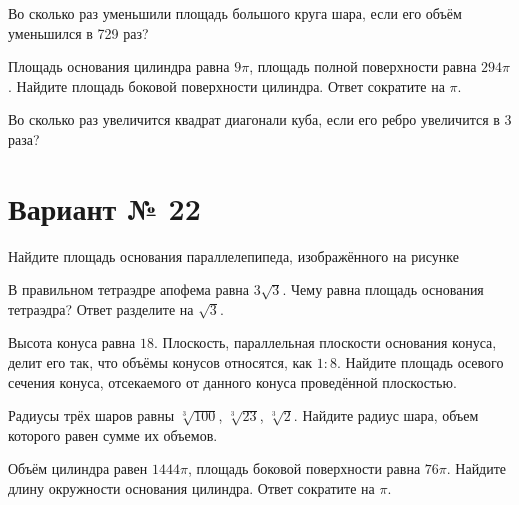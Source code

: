 \documentclass[4apaper]{article}
\begin{document}
\begin{taskBN}{4}
Во сколько раз уменьшили площадь большого круга шара, если его объём уменьшился в 729 раз?
\end{taskBN}

\begin{taskBN}{5}
Площадь основания цилиндра равна $9\pi$, площадь полной поверхности равна $294\pi$. Найдите площадь боковой поверхности цилиндра. Ответ сократите на $\pi$.
\end{taskBN}

\begin{taskBN}{6}
Во сколько раз увеличится квадрат диагонали куба, если его ребро увеличится в 3 раза?
\end{taskBN}
\newpage\section*{Вариант № 22}

\begin{taskBN}{1}
Найдите площадь основания параллелепипеда, изображённого на рисунке
\end{taskBN}

\begin{taskBN}{2}
В правильном тетраэдре апофема равна $3\sqrt{3}$. Чему равна площадь основания тетраэдра? Ответ разделите на $\sqrt{3}$.
\end{taskBN}

\begin{taskBN}{3}
Высота конуса равна $18$. Плоскость, параллельная плоскости основания конуса,  делит его так, что объёмы конусов относятся, как $1:8$. Найдите площадь осевого сечения конуса, отсекаемого от данного конуса проведённой плоскостью. 
\end{taskBN}

\begin{taskBN}{4}
Радиусы трёх шаров равны $\sqrt[3]{100}$, $\sqrt[3]{23}$, $\sqrt[3]{2}$. Найдите радиус шара, объем которого равен сумме их объемов.
\end{taskBN}

\begin{taskBN}{5}
Объём цилиндра равен $1444\pi$, площадь боковой поверхности равна $76\pi$. Найдите длину окружности основания цилиндра. Ответ сократите на $\pi$.
\end{taskBN}
\end{document}
